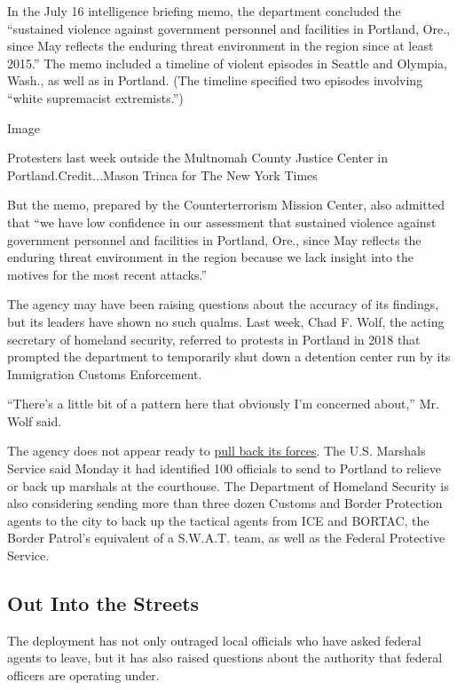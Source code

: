 In the July 16 intelligence briefing memo, the department concluded the
``sustained violence against government personnel and facilities in
Portland, Ore., since May reflects the enduring threat environment in
the region since at least 2015.'' The memo included a timeline of
violent episodes in Seattle and Olympia, Wash., as well as in Portland.
(The timeline specified two episodes involving ``white supremacist
extremists.'')

Image

Protesters last week outside the Multnomah County Justice Center in
Portland.Credit...Mason Trinca for The New York Times

But the memo, prepared by the Counterterrorism Mission Center, also
admitted that ``we have low confidence in our assessment that sustained
violence against government personnel and facilities in Portland, Ore.,
since May reflects the enduring threat environment in the region because
we lack insight into the motives for the most recent attacks.''

The agency may have been raising questions about the accuracy of its
findings, but its leaders have shown no such qualms. Last week, Chad F.
Wolf, the acting secretary of homeland security, referred to protests in
Portland in 2018 that prompted the department to temporarily shut down a
detention center run by its Immigration Customs Enforcement.

``There's a little bit of a pattern here that obviously I'm concerned
about,'' Mr. Wolf said.

The agency does not appear ready to
\href{https://www.opb.org/news/article/more-federal-officers-deploying-portland/}{pull
back its forces}. The U.S. Marshals Service said Monday it had
identified 100 officials to send to Portland to relieve or back up
marshals at the courthouse. The Department of Homeland Security is also
considering sending more than three dozen Customs and Border Protection
agents to the city to back up the tactical agents from ICE and BORTAC,
the Border Patrol's equivalent of a S.W.A.T. team, as well as the
Federal Protective Service.

\hypertarget{out-into-the-streets}{%
\subsection{Out Into the Streets}\label{out-into-the-streets}}

The deployment has not only outraged local officials who have asked
federal agents to leave, but it has also raised questions about the
authority that federal officers are operating under.

